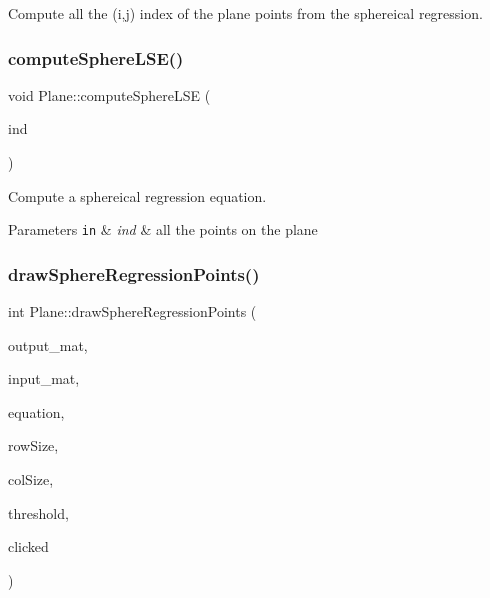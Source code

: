 Compute all the (i,j) index of the plane points from the sphereical regression. 

\hypertarget{class_plane_a60923e0c6d087076a234a9d5bd45d0fa}{}\label{class_plane_a60923e0c6d087076a234a9d5bd45d0fa} 
\subsubsection{\texorpdfstring{compute\+Sphere\+L\+S\+E()}{computeSphereLSE()}}
{\footnotesize\ttfamily void Plane\+::compute\+Sphere\+L\+SE (\begin{DoxyParamCaption}\item[{pcl\+::\+Point\+Indices \&}]{ind }\end{DoxyParamCaption})\hspace{0.3cm}{\ttfamily [private]}}



Compute a sphereical regression equation. 


\begin{DoxyParams}[1]{Parameters}
\mbox{\tt in}  & {\em ind} & all the points on the plane \\
\hline
\end{DoxyParams}
\hypertarget{class_plane_a12c28b7eeb8cdef5451e2e90704e0673}{}\label{class_plane_a12c28b7eeb8cdef5451e2e90704e0673} 
\subsubsection{\texorpdfstring{draw\+Sphere\+Regression\+Points()}{drawSphereRegressionPoints()}}
{\footnotesize\ttfamily int Plane\+::draw\+Sphere\+Regression\+Points (\begin{DoxyParamCaption}\item[{cv\+::\+Mat \&}]{output\+\_\+mat,  }\item[{cv\+::\+Mat \&}]{input\+\_\+mat,  }\item[{std\+::vector$<$ double $>$ \&}]{equation,  }\item[{const int}]{row\+Size,  }\item[{const int}]{col\+Size,  }\item[{const double}]{threshold,  }\item[{bool}]{clicked }\end{DoxyParamCaption})\hspace{0.3cm}{\ttfamily [private]}}

